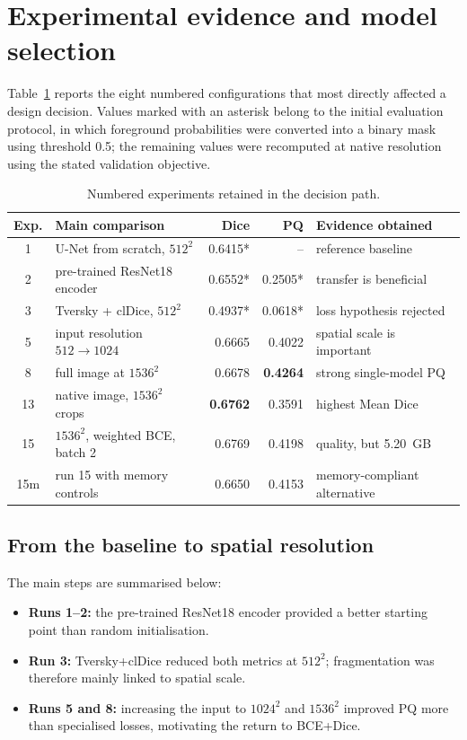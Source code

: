 \section{Experimental evidence and model selection}
\label{sec:results}

Table~\ref{tab:experiments} reports the eight numbered configurations that most directly
affected a design decision. Values marked with an asterisk belong to the initial
evaluation protocol, in which foreground probabilities were converted into a binary
mask using threshold 0.5; the remaining values were recomputed at native resolution
using the stated validation objective.

\begin{table}[H]
  \centering
  \caption{Numbered experiments retained in the decision path.}
  \label{tab:experiments}
  \small\begin{tabular}{clrrl}
    \toprule
    Exp. & Main comparison & Dice & PQ & Evidence obtained \\
    \midrule
    1 & U-Net from scratch, $512^2$ & 0.6415* & -- & reference baseline \\
    2 & pre-trained ResNet18 encoder & 0.6552* & 0.2505* & transfer is beneficial \\
    3 & Tversky + clDice, $512^2$ & 0.4937* & 0.0618* & loss hypothesis rejected \\
    5 & input resolution $512\to1024$ & 0.6665 & 0.4022 & spatial scale is important \\
    8 & full image at $1536^2$ & 0.6678 & \textbf{0.4264} & strong single-model PQ \\
    13 & native image, $1536^2$ crops & \textbf{0.6762} & 0.3591 & highest Mean Dice \\
    15 & $1536^2$, weighted BCE, batch 2 & 0.6769 & 0.4198 & quality, but 5.20~GB \\
    15m & run 15 with memory controls & 0.6650 & 0.4153 & memory-compliant alternative \\
    \bottomrule
  \end{tabular}
\end{table}

\subsection{From the baseline to spatial resolution}

The main steps are summarised below:

\begin{itemize}
\setlength{\itemsep}{0.15em}
\item \textbf{Runs 1--2:} the pre-trained ResNet18 encoder provided a better starting point than random initialisation.
\item \textbf{Run 3:} Tversky+clDice reduced both metrics at $512^2$; fragmentation was therefore mainly linked to spatial scale.
\item \textbf{Runs 5 and 8:} increasing the input to $1024^2$ and $1536^2$ improved PQ more than specialised losses, motivating the return to BCE+Dice.
\end{itemize}

